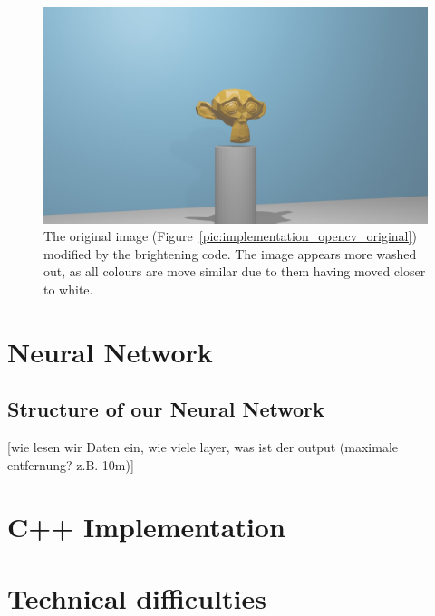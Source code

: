 \begin{figure}[h!]
	\centering
	\includegraphics[width=4.5in]{img/implementation_opencv_brightness.jpg}
	\caption{The original image (Figure~\ref{pic:implementation_opencv_original}) modified by the brightening code. The image appears more washed out, as all colours are move similar due to them having moved closer to white.}
	\label{pic:implementation_opencv_brightness}
\end{figure}

\section{Neural Network}
\subsection{Structure of our Neural Network}

[wie lesen wir Daten ein, wie viele layer, was ist der output (maximale entfernung? z.B. 10m)]

\section{C++ Implementation}

\section{Technical difficulties}

\filbreak

